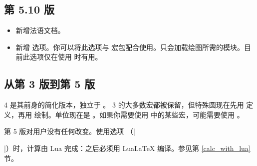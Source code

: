 \endgroup

\subsection{第 5.10 版}
\begin{itemize}
  \item 新增法语文档。
  \item 新增  选项。你可以将此选项与  宏包配合使用。只会加载绘图所需的模块。目前此选项仅在使用  时有用。
\end{itemize}

\subsection{从第 3 版到第 5 版}

\tkzname{\tkznameofpack} 4 是其前身的简化版本，独立于 。 3 的大多数宏都被保留，但特殊圆现在先用  定义，再用  绘制。单位现在是 。如果你需要使用  中的某些宏，可能需要使用 。

第 5 版对用户没有任何改变。使用选项 （|\usepackage[lua]{tkz-euclide}|）时，计算由 Lua 完成：之后必须用 LuaLaTeX 编译。参见第 \ref{calc_with_lua} 节。

